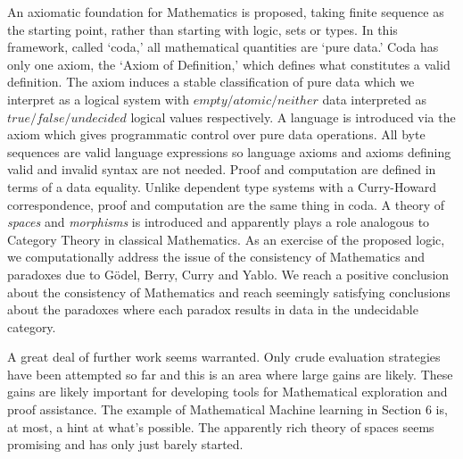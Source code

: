 \documentclass[11pt]{article}
\begin{document}
An axiomatic foundation for Mathematics is proposed, taking finite sequence as the starting point, rather than starting with logic, sets or types.  
In this framework, called `coda,' all mathematical quantities are `pure data.'  Coda has only one axiom, the `Axiom of Definition,' which defines 
what constitutes a valid definition.  The axiom induces a stable classification of pure data which we interpret as a logical system with 
$empty/atomic/neither$ data interpreted as $true/false/undecided$ logical values respectively.  A language is introduced via the axiom which 
gives programmatic control over pure data operations.  All byte sequences are valid language expressions so language axioms and 
axioms defining valid and invalid syntax are not needed.  Proof and computation are defined in terms of a data equality.  Unlike 
dependent type systems with a Curry-Howard correspondence, proof and computation are the same thing in coda.  A theory of {\it spaces} and 
{\it morphisms} is introduced and apparently plays a role analogous to Category Theory in classical 
Mathematics.  As an exercise of the proposed logic, we computationally address the issue of the consistency of Mathematics and paradoxes 
due to G\"odel, Berry, Curry and Yablo.  We reach a positive conclusion about the consistency of Mathematics and reach seemingly 
satisfying conclusions about the paradoxes where each paradox results in data in the undecidable category.  

    A great deal of further work seems warranted.  Only crude evaluation strategies have been attempted so far and this is an area 
where large gains are likely.  These gains are likely important for developing tools for Mathematical exploration and proof assistance.  
The example of Mathematical Machine learning in Section 6 is, at most, a hint at what's possible.  The apparently rich theory 
of spaces seems promising and has only just barely started.   
\end{document}
